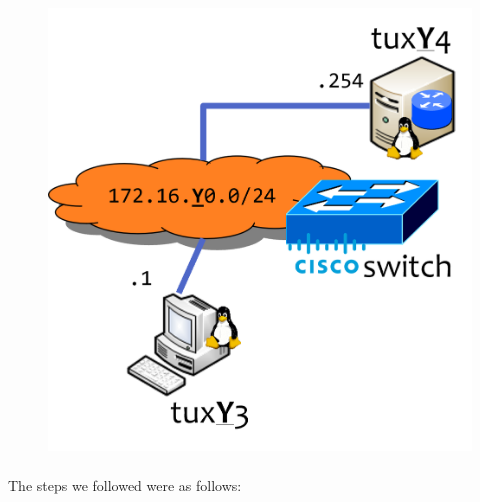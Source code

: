 \documentclass[11pt]{article}
\begin{document}
\begin{figure}[h]
\includegraphics[scale=1]{images/net-exp1.png}
\centering
\end{figure}

\paragraph{}The steps we followed were as follows:
\end{document}
